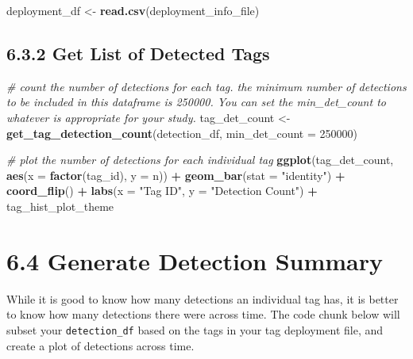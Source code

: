 \documentclass[
]{book}
\newenvironment{Shaded}{\begin{snugshade}}{\end{snugshade}}
\newcommand{\AttributeTok}[1]{\textcolor[rgb]{0.13,0.29,0.53}{#1}}
\newcommand{\CommentTok}[1]{\textcolor[rgb]{0.56,0.35,0.01}{\textit{#1}}}
\newcommand{\DecValTok}[1]{\textcolor[rgb]{0.00,0.00,0.81}{#1}}
\newcommand{\FunctionTok}[1]{\textcolor[rgb]{0.13,0.29,0.53}{\textbf{#1}}}
\newcommand{\NormalTok}[1]{#1}
\newcommand{\OtherTok}[1]{\textcolor[rgb]{0.56,0.35,0.01}{#1}}
\newcommand{\SpecialCharTok}[1]{\textcolor[rgb]{0.81,0.36,0.00}{\textbf{#1}}}
\newcommand{\StringTok}[1]{\textcolor[rgb]{0.31,0.60,0.02}{#1}}
\begin{document}
\begin{Shaded}
\begin{Highlighting}[]
\NormalTok{deployment\_df }\OtherTok{\textless{}{-}} \FunctionTok{read.csv}\NormalTok{(deployment\_info\_file)}
\end{Highlighting}
\end{Shaded}

\subsection{6.3.2 Get List of Detected Tags}\label{get-list-of-detected-tags}

\begin{Shaded}
\begin{Highlighting}[]
\CommentTok{\# count the number of detections for each tag. the minimum number of detections to be included in this dataframe is 250000. You can set the \textasciigrave{}min\_det\_count\textasciigrave{} to whatever is appropriate for your study.}
\NormalTok{tag\_det\_count }\OtherTok{\textless{}{-}} \FunctionTok{get\_tag\_detection\_count}\NormalTok{(detection\_df, }\AttributeTok{min\_det\_count =} \DecValTok{250000}\NormalTok{)}

\CommentTok{\# plot the number of detections for each individual tag}
\FunctionTok{ggplot}\NormalTok{(tag\_det\_count, }
       \FunctionTok{aes}\NormalTok{(}\AttributeTok{x =} \FunctionTok{factor}\NormalTok{(tag\_id), }
           \AttributeTok{y =}\NormalTok{ n)) }\SpecialCharTok{+}
  \FunctionTok{geom\_bar}\NormalTok{(}\AttributeTok{stat =} \StringTok{"identity"}\NormalTok{) }\SpecialCharTok{+}
  \FunctionTok{coord\_flip}\NormalTok{() }\SpecialCharTok{+}
  \FunctionTok{labs}\NormalTok{(}\AttributeTok{x =} \StringTok{"Tag ID"}\NormalTok{, }\AttributeTok{y =} \StringTok{"Detection Count"}\NormalTok{) }\SpecialCharTok{+}
\NormalTok{  tag\_hist\_plot\_theme}
\end{Highlighting}
\end{Shaded}

\section{6.4 Generate Detection Summary}\label{generate-detection-summary}

While it is good to know how many detections an individual tag has, it is better to know how many detections there were across time. The code chunk below will subset your \texttt{detection\_df} based on the tags in your tag deployment file, and create a plot of detections across time.
\end{document}
